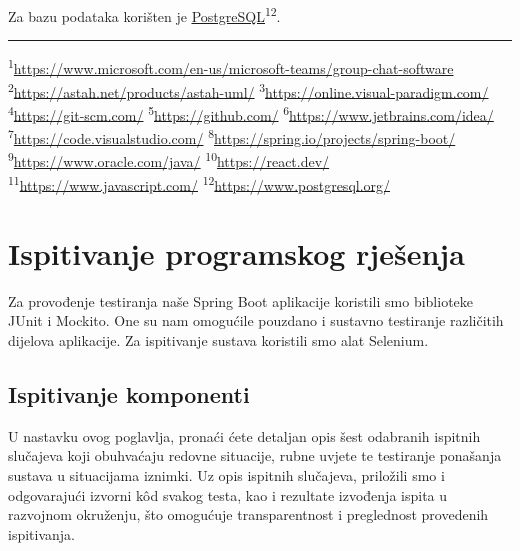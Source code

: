 			\indent Za bazu podataka korišten je \underline{\href{https://www.postgresql.org/}{PostgreSQL}}\textsuperscript{12}.
			\noindent\\[1ex]\rule{0.5\linewidth}{0.5pt}\newline
			\noindent\textsuperscript{1}\url{https://www.microsoft.com/en-us/microsoft-teams/group-chat-software}\newline
			\noindent\textsuperscript{2}\url{https://astah.net/products/astah-uml/}\newline
			\noindent\textsuperscript{3}\url{https://online.visual-paradigm.com/}\newline
			\noindent\textsuperscript{4}\url{https://git-scm.com/}\newline
			\noindent\textsuperscript{5}\url{https://github.com/}\newline
			\noindent\textsuperscript{6}\url{https://www.jetbrains.com/idea/}\newline
			\noindent\textsuperscript{7}\url{https://code.visualstudio.com/}\newline
			\noindent\textsuperscript{8}\url{https://spring.io/projects/spring-boot/}\newline
			\noindent\textsuperscript{9}\url{https://www.oracle.com/java/}\newline
			\noindent\textsuperscript{10}\url{https://react.dev/}\newline
			\noindent\textsuperscript{11}\url{https://www.javascript.com/}\newline
			\noindent\textsuperscript{12}\url{https://www.postgresql.org/}\newline
			
		\newpage
		
		\section{Ispitivanje programskog rješenja}
			
			\indent Za provođenje testiranja naše Spring Boot aplikacije koristili smo biblioteke JUnit i Mockito. One su nam omogućile pouzdano i sustavno testiranje različitih dijelova aplikacije. Za ispitivanje sustava koristili smo alat Selenium.
			 
	
			
			\subsection{Ispitivanje komponenti}
			U nastavku ovog poglavlja, pronaći ćete detaljan opis šest odabranih ispitnih slučajeva koji obuhvaćaju redovne situacije, rubne uvjete te testiranje ponašanja sustava u situacijama iznimki. Uz opis ispitnih slučajeva, priložili smo i odgovarajući izvorni kôd svakog testa, kao i rezultate izvođenja ispita u razvojnom okruženju, što omogućuje transparentnost i preglednost provedenih ispitivanja.
			
